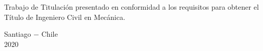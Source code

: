 {\begin{flushright}
\begin{minipage}{7cm}
\small{Trabajo de Titulación presentado en conformidad a los requisitos para obtener el Título de Ingeniero Civil en Mecánica.}
\end{minipage}
\end{flushright}

\vspace{3\baselineskip}

\begin{center}
\begin{minipage}[c]{15cm}
\centering
\small{Santiago $-$ Chile \\ 2020}
\end{minipage}
\end{center}

\restoregeometry
}
